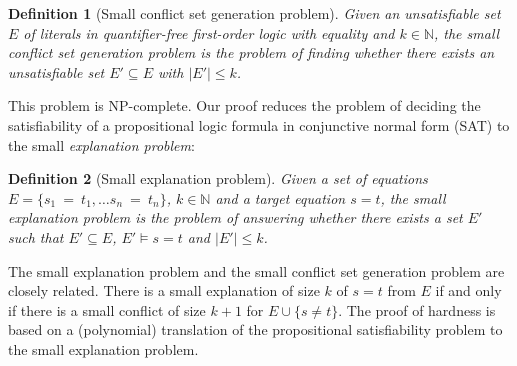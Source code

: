 \documentclass{easychair}
\newtheorem{definition}{Definition}
\begin{document}
\begin{definition}[Small conflict set generation problem]
Given an unsatisfiable set $E$ of literals in quantifier-free first-order logic
with equality and $k \in \mathbb{N}$, the \emph{small conflict set generation
  problem} is the problem of finding whether there exists an unsatisfiable set
$E' \subseteq E$ with $|E'| \leq k$.
\end{definition}
\noindent This problem is NP-complete.  Our proof reduces the problem
of deciding the satisfiability of a propositional logic formula in conjunctive
normal form (SAT) to the small \emph{explanation problem}:
\begin{definition}[Small explanation problem]
Given a set of equations $E = \{ s_1~=~t_1,\ldots s_n~=~t_n\}$, $k \in
\mathbb{N}$ and a target equation $s = t$, the \emph{small explanation problem}
is the problem of answering whether there exists a set $E'$ such that $E'
\subseteq E$, $E' \models s = t$ and $|E'| \leq k$.
\end{definition}

\noindent The small explanation problem and the small conflict set generation
problem are closely related.  There is a small explanation of size $k$ of $s=t$
from $E$ if and only if there is a small conflict of size $k+1$ for $E \cup
\{s\neq t\}$.  The proof of hardness is based on a (polynomial) translation of
the propositional satisfiability problem to the small explanation problem.

\newcommand{\Assignment}{{\it Assignment}}
\newcommand{\Clause}{{\it Clause}}
\newcommand{\Connect}{{\it Connect}}
\end{document}
